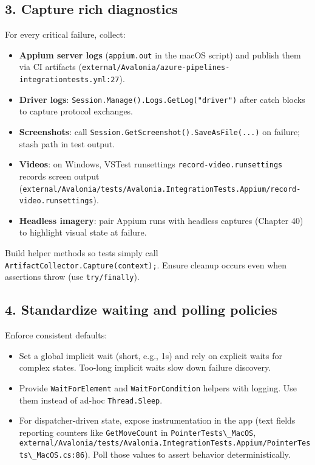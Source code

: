 \subsection{3. Capture rich diagnostics}\label{capture-rich-diagnostics}

For every critical failure, collect:

\begin{itemize}
\tightlist
\item
  \textbf{Appium server logs} (\passthrough{\lstinline!appium.out!} in
  the macOS script) and publish them via CI artifacts
  (\passthrough{\lstinline!external/Avalonia/azure-pipelines-integrationtests.yml:27!}).
\item
  \textbf{Driver logs}:
  \passthrough{\lstinline!Session.Manage().Logs.GetLog("driver")!} after
  catch blocks to capture protocol exchanges.
\item
  \textbf{Screenshots}: call
  \passthrough{\lstinline!Session.GetScreenshot().SaveAsFile(...)!} on
  failure; stash path in test output.
\item
  \textbf{Videos}: on Windows, VSTest runsettings
  \passthrough{\lstinline!record-video.runsettings!} records screen
  output
  (\passthrough{\lstinline!external/Avalonia/tests/Avalonia.IntegrationTests.Appium/record-video.runsettings!}).
\item
  \textbf{Headless imagery}: pair Appium runs with headless captures
  (Chapter 40) to highlight visual state at failure.
\end{itemize}

Build helper methods so tests simply call
\passthrough{\lstinline!ArtifactCollector.Capture(context);!}. Ensure
cleanup occurs even when assertions throw (use
\passthrough{\lstinline!try/finally!}).

\subsection{4. Standardize waiting and polling
policies}\label{standardize-waiting-and-polling-policies}

Enforce consistent defaults:

\begin{itemize}
\tightlist
\item
  Set a global implicit wait (short, e.g., 1s) and rely on explicit
  waits for complex states. Too-long implicit waits slow down failure
  discovery.
\item
  Provide \passthrough{\lstinline!WaitForElement!} and
  \passthrough{\lstinline!WaitForCondition!} helpers with logging. Use
  them instead of ad-hoc \passthrough{\lstinline!Thread.Sleep!}.
\item
  For dispatcher-driven state, expose instrumentation in the app (text
  fields reporting counters like \passthrough{\lstinline!GetMoveCount!}
  in \passthrough{\lstinline!PointerTests\_MacOS!},
  \passthrough{\lstinline!external/Avalonia/tests/Avalonia.IntegrationTests.Appium/PointerTests\_MacOS.cs:86!}).
  Poll those values to assert behavior deterministically.
\end{itemize}

